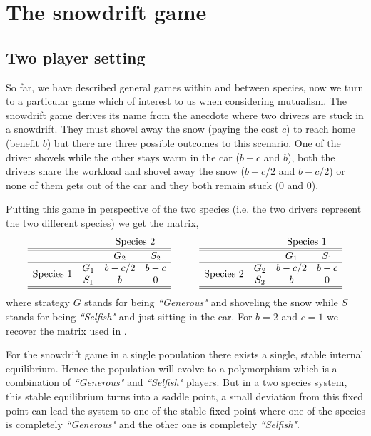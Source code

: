 \documentclass[aps,pre,amsfonts,floatfix, onecolumn,showkeys]{revtex4-1}
\begin{document}
\section{The snowdrift game}
\label{appA}
\subsection{Two player setting}
So far, we have described general games within and between species, now we turn to a particular game which of interest to us when considering mutualism.
The snowdrift game derives its name from the anecdote where two drivers are stuck in a snowdrift.
They must shovel away the snow (paying the cost $c$) to reach home (benefit $b$) but there are three possible outcomes to this scenario.
One of the driver shovels while the other stays warm in the car ($b-c$ and $b$), both the drivers share the workload and shovel away the snow ($b-c/2$ and $b-c/2$) or none of them gets out of the car and they both remain stuck ($0$ and $0$).

Putting this game in perspective of the two species (i.e. the two drivers represent the two different species) we get the matrix,\\
%
\begin{equation}\label{}
\begin{array}{cccc}
& & \multicolumn{2}{c}{\text{Species 2}}\\
\hline\hline
&	&	G_2		&	S_2	\\
\hline
 \multirow{2}{*}{Species 1} & G_1 	& b-c/2 &	b-c \\
&	S_1	&  b & 0 \\
 \hline\hline
\end{array}
\hspace{1cm}
\begin{array}{cccc}
& & \multicolumn{2}{c}{\text{Species 1}}\\
\hline\hline
&	&	G_1		&	S_1	\\
\hline
 \multirow{2}{*}{Species 2} & G_2 	& b-c/2 &	b-c \\
&	S_2	& b & 0 \nonumber \\
 \hline\hline
\end{array}
\end{equation}
%
where strategy $G$ stands for being \textit{``Generous"} and shoveling the snow while $S$ stands for being \textit{``Selfish"} and just sitting in the car.
For $b=2$ and $c=1$ we recover the matrix used in \cite{bergstrom:PNAS:2003}.

For the snowdrift game in a single population there exists a single, stable internal equilibrium.
Hence the population will evolve to a polymorphism which is a combination of \textit{``Generous"} and \textit{``Selfish"} players.
But in a two species system, this stable equilibrium turns into a saddle point, a small deviation from this fixed point can lead the system to one of the stable fixed point where one of the species is completely \textit{``Generous"} 
and the other one is completely \textit{``Selfish"}.
\end{document}
